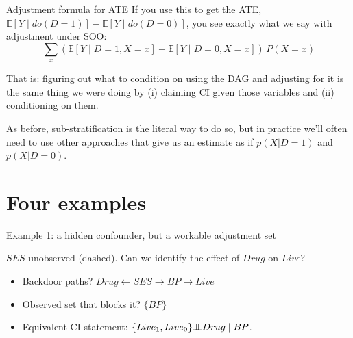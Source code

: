 \documentclass[xcolor=dvipsnames]{beamer}
\newcommand{\la}{\leftarrow}
\newcommand\E{\mathbb{E}}
\newcommand{\indep}{{\bot\negthickspace\negthickspace\bot}}
\begin{document}
\begin{frame}{Adjustment formula for ATE}
 If you use this to get the ATE, $\E[Y \mid do(D=1)]-\E[Y \mid do(D=0)]$, you see exactly what we say with adjustment under SOO:\\

$$ \sum_x \left(\E[Y \mid D\!=\!1, X\!=\!x]-\E[Y \mid D\!=\!0, X\!=\!x]\right)\,P(X\!=\!x)$$


\medskip
{} That is: figuring out what to condition on using the DAG and adjusting for it is the same thing we were doing by (i) claiming CI given those variables and (ii) conditioning on them.\\

\bigskip

 As before, sub-stratification is the literal way to do so, but in practice we'll often need to use other approaches that give us an estimate as if $p(X|D=1)$ and $p(X|D=0)$.\\



\end{frame}

\section{Four examples}

\begin{frame}{Example 1: a hidden confounder, but a workable adjustment set}
\begin{center}
\end{center}
\footnotesize
$SES$ unobserved (dashed).  Can we identify the effect of $Drug$ on $Live$?

\small
\begin{itemize}
\item<2-> Backdoor paths?  $Drug \la SES \to BP \to Live$
\item<4-> Observed set that blocks it?  $\{BP\}$
\item<6-> Equivalent CI statement: $\{Live_{1}, Live_{0}\} \indep Drug \mid BP$.
\end{itemize}
\end{frame}
\end{document}
